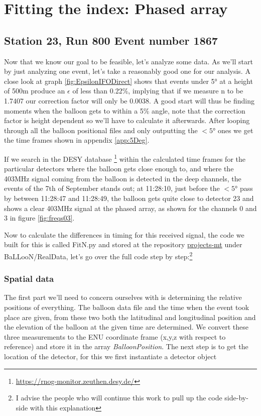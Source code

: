 \section{Fitting the index: Phased array}
\subsection{Station 23, Run 800 Event number 1867}
Now that we know our goal to be feasible, let's analyze some data.  As we'll
start by just analyzing one event, let's take a reasonably good one for our analysis.
A close look at graph \ref{fig:EpsilonIFODirect} shows that events under 5° at
a height of 500m produce an $\epsilon$ of less than 0.22\%, implying that if we
measure n to be 1.7407 our correction factor will only be 0.0038.  A good start will
thus be finding moments when the balloon gets to within a 5\% angle, note that
the correction factor is height dependent so we'll have to calculate it afterwards.  After
looping through all the balloon positional files and only outputting the $<5$°
ones we get the time frames shown in appendix \ref{app:5Deg}.

If we search in the DESY database
\footnote{\url{https://rnog-monitor.zeuthen.desy.de/}} within the calculated
time frames for the particular detectors where the balloon gets close enough to,
and where the 403MHz signal coming from the balloon is detected in the deep channels, the events of the 7th
of September stands out; at 11:28:10,  just before the $<5$° pass by between
11:28:47 and 11:28:49, the balloon gets quite close to detector 23 and shows a
clear 403MHz signal at the phased array, as shown for the channels 0 and 3 in
figure \ref{fig:freqs03}.

Now to calculate the differences in timing for this received signal, the code
we built for this is called FitN.py and stored at the repository
\href{https://github.com/arthuradriaens-code/projects-mt.git}{projects-mt}
under BaLLooN/RealData, let's go over the full code step by step:\footnote{I advise 
the people who will continue this work to pull up the code side-by-side with this 
explanation}

\subsubsection{Spatial data}
The first part we'll need to concern ourselves with is determining the relative
positions of everything. The balloon data file and the time when the event took
place are given, from these two both the latitudinal and longitudinal position
and the elevation of the balloon at the given time are determined. We convert
these three measurements to the ENU coordinate frame (x,y,z with respect to
reference) and store it in the array \textit{BalloonPosition}. The next step is
to get the location of the detector, for this we first instantiate a detector
object 


